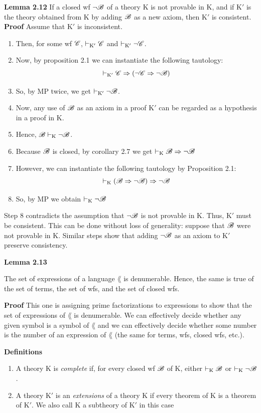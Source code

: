 \textbf{Lemma 2.12}
If a closed wf $\lnot \mathscr{B}$ of a theory K is not provable in K, and if K$'$ is the theory obtained from K by adding $\mathscr{B}$ as a new axiom, then K$'$ is consistent.\\ 
\textbf{Proof}
Assume that K$'$ is inconsistent.
\begin{enumerate}
    \item Then, for some wf $\mathscr{C}$, $\vdash_{\text{K}'} \mathscr{C}$ and $\vdash_{\text{K}'} \lnot \mathscr{C}$.
    \item Now, by proposition 2.1 we can instantiate the following tautology:
    \[\vdash_{\text{K}'} \mathscr{C} \Rightarrow (\lnot \mathscr{C} \Rightarrow \lnot \mathscr{B})\]
    \item So, by MP twice, we get $\vdash_{\text{K}'} \lnot \mathscr{B}$.
    \item Now, any use of $\mathscr{B}$ as an axiom in a proof K$'$ can be regarded as a hypothesis in a proof in K.
    \item Hence, $\mathscr{B} \vdash_\text{K} \lnot \mathscr{B}$. 
    \item Because $\mathscr{B}$ is closed, by corollary 2.7 we get $\vdash_\text{K} \mathscr{B} \Rightarrow \lnot \mathscr{B}$
    \item However, we can instantiate the following tautology by Proposition 2.1:
    \[\vdash_\text{K} (\mathscr{B} \Rightarrow \lnot \mathscr{B}) \Rightarrow \lnot \mathscr{B}\]
    \item So, by MP we obtain $\vdash_\text{K} \lnot \mathscr{B}$
\end{enumerate}
Step 8 contradicts the assumption that $\lnot \mathscr{B}$ is not provable in K. Thus, K$'$ must be consistent. This can be done without loss of generality: suppose that $\mathscr{B}$ were not provable in K. Similar steps show that adding $\lnot \mathscr{B}$ as an axiom to K$'$ preserve consistency.

\textbf{Lemma 2.13}

The set of expressions of a language $\lang$ is denumerable. Hence, the same is true of the set of terms, the set of wfs, and the set of closed wfs.

\textbf{Proof}
This one is assigning prime factorizations to expressions to show that the set of expressions of $\lang$ is denumerable. We can effectively decide whether any given symbol is a symbol of $\lang$ and we can effectively decide whether some number is the number of an expression of $\lang$ (the same for terms, wfs, closed wfs, etc.). 

\textbf{Definitions}
\begin{enumerate} [label = \roman*.]
    \item A theory K is \textit{complete} if, for every closed wf $\mathscr{B}$ of K, either $\vdash_\text{K} \mathscr{B}$ or $\vdash_\text{K} \lnot \mathscr{B}$.
    \item A theory K$'$ is an \textit{extensions} of a theory K if every theorem of K is a theorem of K$'$. We also call K a subtheory of K$'$ in this case
\end{enumerate}

